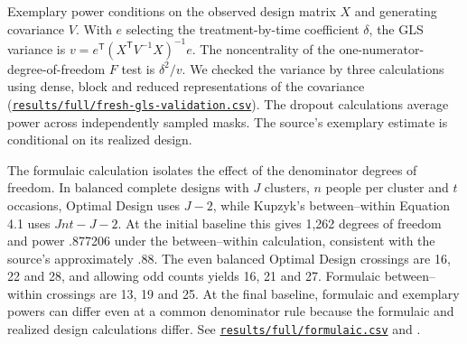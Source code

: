 Exemplary power conditions on the observed design matrix \(X\) and generating covariance \(V\). With \(e\) selecting the treatment-by-time coefficient \(\delta\), the GLS variance is \(v=e^\mathsf{T}(X^\mathsf{T}V^{-1}X)^{-1}e\). The noncentrality of the one-numerator-degree-of-freedom \(F\) test is \(\delta^2/v\). We checked the variance by three calculations using dense, block and reduced representations of the covariance (\href{https://github.com/alectionary/vibe-math/blob/master/formalization/kupzyk-power-assumptions/results/full/fresh-gls-validation.csv}{\nolinkurl{results/full/fresh-gls-validation.csv}}). The dropout calculations average power across independently sampled masks. The source's exemplary estimate is conditional on its realized design.

The formulaic calculation isolates the effect of the denominator degrees of freedom. In balanced complete designs with \(J\) clusters, \(n\) people per cluster and \(t\) occasions, Optimal Design uses \(J-2\), while Kupzyk's between--within Equation 4.1 uses \(Jnt-J-2\). At the initial baseline this gives 1,262 degrees of freedom and power .877206 under the between--within calculation, consistent with the source's approximately .88. The even balanced Optimal Design crossings are 16, 22 and 28, and allowing odd counts yields 16, 21 and 27. Formulaic between--within crossings are 13, 19 and 25. At the final baseline, formulaic and exemplary powers can differ even at a common denominator rule because the formulaic and realized design calculations differ. See \href{https://github.com/alectionary/vibe-math/blob/master/formalization/kupzyk-power-assumptions/results/full/formulaic.csv}{\nolinkurl{results/full/formulaic.csv}} and \citet[pp.~83--89, 97, 103--104]{kupzyk2011}.

